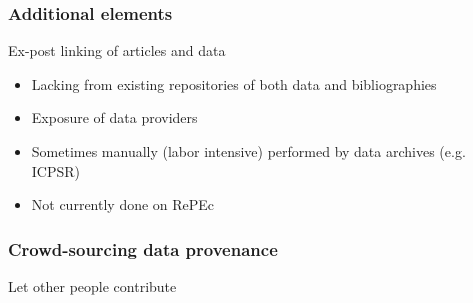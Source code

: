 \begin{frame}
	\frametitle{Additional elements}
	\begin{block}{Ex-post linking of articles and data}
	\begin{itemize}
		\item Lacking from existing repositories of both data and bibliographies
		\item Exposure of data providers
		\item Sometimes manually (labor intensive) performed by data archives (e.g. ICPSR)
		\item Not currently done on RePEc
	\end{itemize}
	\end{block}
\end{frame}


\begin{frame}
	\frametitle{Crowd-sourcing data provenance}
	\begin{block}{Let other people contribute}
\end{block}
\end{frame}
